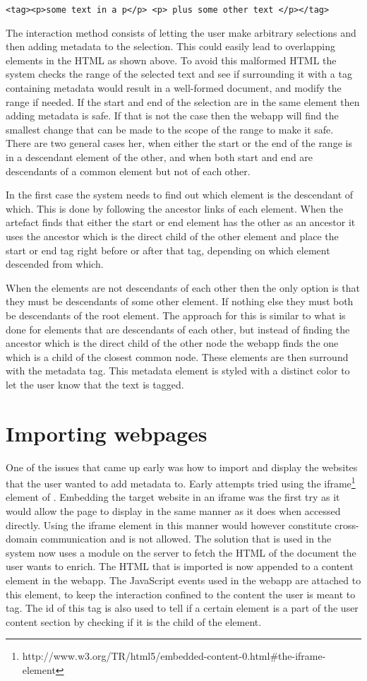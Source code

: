 \texttt{<tag><p>some text in a p</p> <p> plus some other text </p></tag>}

The interaction method consists of letting the user make arbitrary selections and then adding metadata to the selection.
This could easily lead to overlapping elements in the HTML as shown above.
To avoid this malformed HTML the system checks the range of the selected text and see if surrounding it with a tag
containing metadata would result in a well-formed document, and modify the range if needed.
If the start and end of the selection are in the same element then adding metadata is safe.
If that is not the case then the webapp will find the smallest change that can be made to the scope of the range to make it safe.
There are two general cases her, when either the start or the end of the range is in a descendant element of the other,
and when both start and end are descendants of a common element but not of each other.

In the first case the system needs to find out which element is the descendant of which.
This is done by following the ancestor links of each element.
When the artefact finds that either the start or end element has the other as an ancestor it uses the ancestor which is the direct
child of the other element and place the start or end tag right before or after that tag, depending on which element
descended from which.

When the elements are not descendants of each other then the only option is that they must be descendants of some other element.
If nothing else they must both be descendants of the root element.
The approach for this is similar to what is done for elements that are descendants of each other,
but instead of finding the ancestor which is the direct child of the other node the webapp finds the one which is a child of the
closest common node.
These elements are then surround with the metadata tag.
This metadata element is styled with a distinct color to let the user know that the text is tagged.

\section{Importing webpages}
One of the issues that came up early was how to import and display the websites that the user wanted to add metadata to.
Early attempts tried using the iframe\footnote{http://www.w3.org/TR/html5/embedded-content-0.html\#the-iframe-element}
element of .
Embedding the target website in an iframe was the first try as it would allow the page to display in the same manner
as it does when accessed directly.
Using the iframe element in this manner would however constitute cross-domain communication and is not allowed.
The solution that is used in the system now uses a module on the server to fetch the HTML of the document the user wants to enrich.
The HTML that is imported is now appended to a content element in the webapp.
The JavaScript events used in the webapp are attached to this element,
to keep the interaction confined to the content the user is meant to tag.
The id of this tag is also used to tell if a certain element is a part of the user content section by checking if it is
the child of the element.

